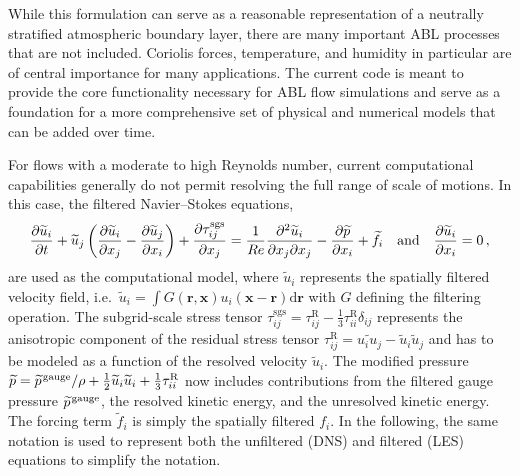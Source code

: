 \documentclass[gmd, manuscript]{copernicus}
\begin{document}
While this formulation can serve as a reasonable representation of a neutrally stratified atmospheric boundary layer, there are many important ABL processes that are not included.
Coriolis forces, temperature, and humidity in particular are of central importance for many applications.
The current code is meant to provide the core functionality necessary for ABL flow simulations and serve as a foundation for a more comprehensive set of physical and numerical models that can be added over time.

For flows with a moderate to high Reynolds number, current computational capabilities generally do not permit resolving the full range of scale of motions.
In this case, the filtered Navier--Stokes equations,
\begin{equation}
  \frac{\partial \widetilde{u}_i}{\partial t} + \widetilde{u}_j \left( \frac{\partial \widetilde{u}_i}{\partial x_j} - \frac{\partial \widetilde{u}_j}{\partial x_i} \right) +
  \frac{\partial \tau_{ij}^\mathrm{sgs}}{\partial x_j} =
  \frac{1}{R \mkern -.2mue} \frac{\partial^2 \widetilde{u}_i}{\partial x_j \partial x_j}
  - \frac{\partial \widetilde{p}}{\partial x_i}
  + \widetilde{f}_i
  \quad \text{and} \quad
  \frac{\partial \widetilde{u}_i}{\partial x_i} = 0
  \,,
\label{eq:ns-les}
\end{equation}
are used as the computational model, where \(\widetilde{u}_i\) represents the spatially filtered velocity field, i.e.~\(\widetilde{u}_i = \int G(\boldsymbol{r},\boldsymbol{x}) u_i(\boldsymbol{x}-\boldsymbol{r}) \mathrm{d}{\boldsymbol{r}}\) with \(G\) defining the filtering operation.
The subgrid-scale stress tensor \(\tau_{ij}^\mathrm{sgs} = \tau_{ij}^\mathrm{R} - \frac{1}{3} \tau_{ii}^\mathrm{R} \delta_{ij}\) represents the anisotropic component of the residual stress tensor \(\tau_{ij}^\mathrm{R} = \widetilde{u_i u_j} - \widetilde{u}_i \widetilde{u}_j\) and has to be modeled as a function of the resolved velocity \(\widetilde{u}_i\).
The modified pressure \(\widetilde{p} = \widetilde{p}^\mathrm{\mkern2mu gauge}/\rho + \frac{1}{2} \widetilde{u}_i \widetilde{u}_i + \frac{1}{3} \tau_{ii}^\mathrm{R}\) now includes contributions from the filtered gauge pressure \(\widetilde{p}^\mathrm{\mkern2mu gauge}\), the resolved kinetic energy, and the unresolved kinetic energy.
The forcing term \(\widetilde{f}_i\) is simply the spatially filtered \(f_i\).
In the following, the same notation is used to represent both the unfiltered (DNS) and filtered (LES) equations to simplify the notation.
\end{document}
